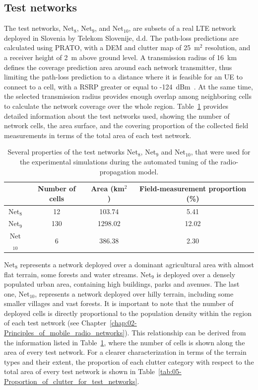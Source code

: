\subsection{Test networks \label{sub:05-Test_networks}}

The test networks, Net$_{8}$, Net$_{9}$, and Net$_{10}$, are subsets
of a real LTE network deployed in Slovenia by Telekom Slovenije, d.d.
The path-loss predictions are calculated using PRATO, with a DEM and
clutter map of 25~m$^{2}$ resolution, and a receiver height of 2~m
above ground level. A transmission radius of 16~km defines the coverage
prediction area around each network transmitter, thus limiting the
path-loss prediction to a distance where it is feasible for an UE
to connect to a cell, with a RSRP greater or equal to -124~dBm~\cite{Neuland_Influence_of_Different_Factors_on_X_Map_Estimation_in_LTE:2011}.
At the same time, the selected transmission radius provides enough
overlap among neighboring cells to calculate the network coverage
over the whole region. Table~\ref{tab:05-Test_network_properties}
provides detailed information about the test networks used, showing
the number of network cells, the area surface, and the covering proportion
of the collected field measurements in terms of the total area of
each test network.

\begin{table}
\centering

\caption{Several properties of the test networks Net$_{8}$, Net$_{9}$ and
Net$_{10}$, that were used for the experimental simulations during
the automated tuning of the radio-propagation model.\label{tab:05-Test_network_properties}}


\begin{tabular}{cccc}
\cline{2-4} 
 & Number of cells  & Area (km$^{2}$) & Field-measurement proportion (\%)\tabularnewline
\hline 
Net$_{8}$  & 12 & 103.74 & 5.41\tabularnewline
Net$_{9}$  & 130  & 1298.02 & 12.02\tabularnewline
Net$_{10}$  & 6  & 386.38 & 2.30\tabularnewline
\hline 
\end{tabular}
\end{table}


Net$_{8}$ represents a network deployed over a dominant agricultural
area with almost flat terrain, some forests and water streams. Net$_{9}$
is deployed over a densely populated urban area, containing high buildings,
parks and avenues. The last one, Net$_{10}$, represents a network
deployed over hilly terrain, including some smaller villages and vast
forests. It is important to note that the number of deployed cells
is directly proportional to the population density within the region
of each test network (see Chapter~\ref{chap:02-Principles_of_mobile_radio_networks}).
This relationship can be derived from the information listed in Table~\ref{tab:05-Test_network_properties},
where the number of cells is shown along the area of every test network.
For a clearer characterization in terms of the terrain types and their
extent, the proportion of each clutter category with respect to the
total area of every test network is shown in Table~\ref{tab:05-Proportion_of_clutter_for_test_networks}.

